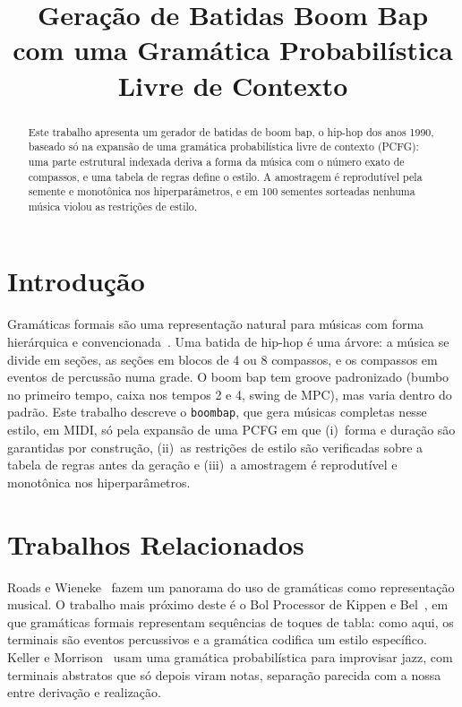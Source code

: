 \documentclass{article}
\title{Geração de Batidas Boom Bap com uma Gramática Probabilística Livre de Contexto}
\newcommand{\tm}[1]{\texttt{#1}}
\begin{document}
\maketitle

\begin{abstract}
Este trabalho apresenta um gerador de batidas de boom bap, o hip-hop dos anos 1990, baseado só na
expansão de uma gramática probabilística livre de contexto (PCFG): uma parte estrutural indexada deriva
a forma da música com o número exato de compassos, e uma tabela de regras define o estilo. A
amostragem é reprodutível pela semente e monotônica nos hiperparâmetros, e em 100 sementes sorteadas
nenhuma música violou as restrições de estilo.
\end{abstract}

\section{Introdução}\label{sec:intro}

Gramáticas formais são uma representação natural para músicas com forma hierárquica e
convencionada~\cite{Roads79,Lerdahl83}. Uma batida de hip-hop é uma árvore: a música se divide em
seções, as seções em blocos de 4 ou 8 compassos, e os compassos em eventos de percussão numa grade.
O boom bap tem groove padronizado (bumbo no primeiro tempo, caixa nos
tempos 2 e 4, swing de MPC), mas varia dentro do padrão. Este trabalho descreve o \tm{boombap}, que gera músicas completas nesse estilo, em MIDI, só
pela expansão de uma PCFG em que (i)~forma e duração são garantidas por construção, (ii)~as restrições
de estilo são verificadas sobre a tabela de regras antes da geração e (iii)~a amostragem é
reprodutível e monotônica nos hiperparâmetros.

\section{Trabalhos Relacionados}\label{sec:related}

Roads e Wieneke~\cite{Roads79} fazem um panorama do uso de gramáticas como representação musical. O
trabalho mais próximo deste é o Bol Processor de Kippen e Bel~\cite{Kippen92}, em que gramáticas
formais representam sequências de toques de tabla: como aqui, os terminais são eventos percussivos e a
gramática codifica um estilo específico. Keller e Morrison~\cite{Keller07} usam uma gramática
probabilística para improvisar jazz, com terminais abstratos que só depois viram notas, separação
parecida com a nossa entre derivação e realização.
\end{document}
